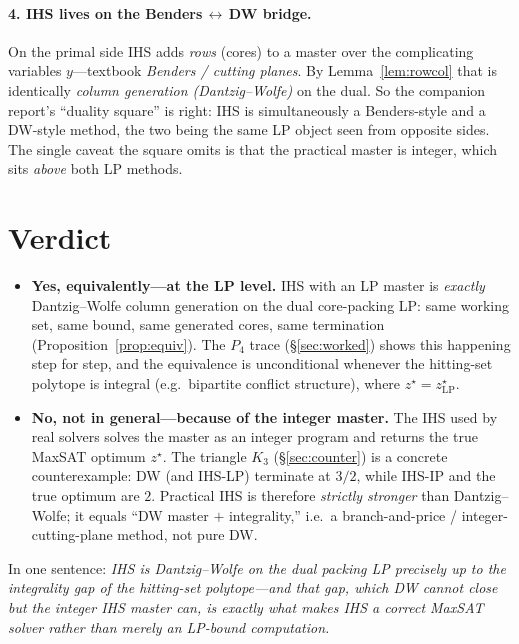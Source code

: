 \documentclass[11pt,a4paper]{article}
\begin{document}
\paragraph{4. IHS lives on the Benders$\,\leftrightarrow\,$DW bridge.}
On the primal side IHS adds \emph{rows} (cores) to a master over the
complicating variables $y$---textbook \emph{Benders / cutting planes}. By
Lemma~\ref{lem:rowcol} that is identically \emph{column generation
(Dantzig--Wolfe)} on the dual. So the companion report's ``duality square'' is
right: IHS is simultaneously a Benders-style and a DW-style method, the two
being the same LP object seen from opposite sides. The single caveat the square
omits is that the practical master is integer, which sits \emph{above} both LP
methods.

\section{Verdict}
\label{sec:verdict}

\begin{itemize}
\item \textbf{Yes, equivalently---at the LP level.} IHS with an LP master is
\emph{exactly} Dantzig--Wolfe column generation on the dual core-packing LP:
same working set, same bound, same generated cores, same termination
(Proposition~\ref{prop:equiv}). The $P_4$ trace (\S\ref{sec:worked}) shows this
happening step for step, and the equivalence is unconditional whenever the
hitting-set polytope is integral (e.g.\ bipartite conflict structure), where
$z^\star = z^\star_{\mathrm{LP}}$.

\item \textbf{No, not in general---because of the integer master.} The IHS used
by real solvers solves the master as an integer program and returns the true
MaxSAT optimum $z^\star$. The triangle $K_3$ (\S\ref{sec:counter}) is a concrete
counterexample: DW (and IHS-LP) terminate at $3/2$, while IHS-IP and the true
optimum are $2$. Practical IHS is therefore \emph{strictly stronger} than
Dantzig--Wolfe; it equals ``DW master $+$ integrality,'' i.e.\ a branch-and-price
/ integer-cutting-plane method, not pure DW.
\end{itemize}

\noindent
In one sentence: \emph{IHS is Dantzig--Wolfe on the dual packing LP precisely up
to the integrality gap of the hitting-set polytope---and that gap, which DW
cannot close but the integer IHS master can, is exactly what makes IHS a correct
MaxSAT solver rather than merely an LP-bound computation.}
\end{document}
